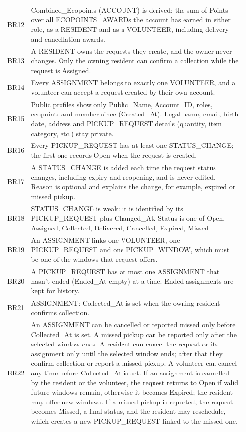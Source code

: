 \begin{longtable}{@{}p{0.07\linewidth}>{\raggedright\arraybackslash}p{0.89\linewidth}@{}}
\addlinespace[2pt]
BR12 & Combined\_Ecopoints (ACCOUNT) is derived: the sum of Points over all ECOPOINTS\_AWARDs the account has earned in either role, as a RESIDENT and as a VOLUNTEER, including delivery and cancellation awards. \\
\addlinespace[2pt]
BR13 & A RESIDENT owns the requests they create, and the owner never changes. Only the owning resident can confirm a collection while the request is Assigned. \\
\addlinespace[2pt]
BR14 & Every ASSIGNMENT belongs to exactly one VOLUNTEER, and a volunteer can accept a request created by their own account. \\
\addlinespace[2pt]
BR15 & Public profiles show only Public\_Name, Account\_ID, roles, ecopoints and member since (Created\_At). Legal name, email, birth date, address and PICKUP\_REQUEST details (quantity, item category, etc.) stay private. \\
\addlinespace[2pt]
BR16 & Every PICKUP\_REQUEST has at least one STATUS\_CHANGE; the first one records Open when the request is created. \\
\addlinespace[2pt]
BR17 & A STATUS\_CHANGE is added each time the request status changes, including expiry and reopening, and is never edited. Reason is optional and explains the change, for example, expired or missed pickup. \\
\addlinespace[2pt]
BR18 & STATUS\_CHANGE is weak: it is identified by its PICKUP\_REQUEST plus Changed\_At. Status is one of Open, Assigned, Collected, Delivered, Cancelled, Expired, Missed. \\
\addlinespace[2pt]
BR19 & An ASSIGNMENT links one VOLUNTEER, one PICKUP\_REQUEST and one PICKUP\_WINDOW, which must be one of the windows that request offers. \\
\addlinespace[2pt]
BR20 & A PICKUP\_REQUEST has at most one ASSIGNMENT that hasn't ended (Ended\_At empty) at a time. Ended assignments are kept for history. \\
\addlinespace[2pt]
BR21 & ASSIGNMENT: Collected\_At is set when the owning resident confirms collection. \\
\addlinespace[2pt]
BR22 & An ASSIGNMENT can be cancelled or reported missed only before Collected\_At is set. A missed pickup can be reported only after the selected window ends. A resident can cancel the request or its assignment only until the selected window ends; after that they confirm collection or report a missed pickup. A volunteer can cancel any time before Collected\_At is set. If an assignment is cancelled by the resident or the volunteer, the request returns to Open if valid future windows remain, otherwise it becomes Expired; the resident may offer new windows. If a missed pickup is reported, the request becomes Missed, a final status, and the resident may reschedule, which creates a new PICKUP\_REQUEST linked to the missed one. \\

\end{longtable}
